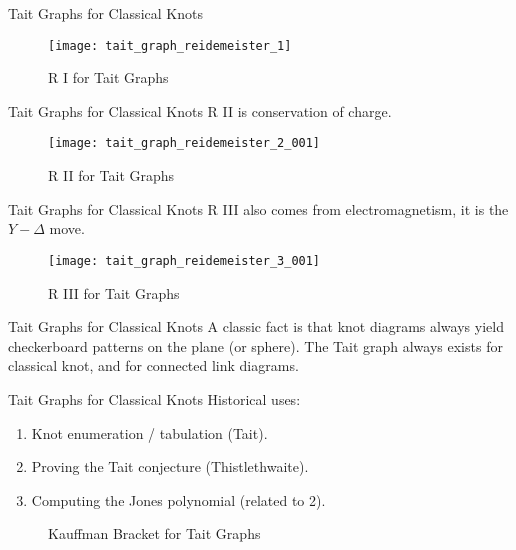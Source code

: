 \documentclass{beamer}
\begin{document}
    \begin{frame}{Tait Graphs for Classical Knots}
        \begin{figure}
            \centering
            \texttt{[image: tait\_graph\_reidemeister\_1]}
            \caption{R I for Tait Graphs}
        \end{figure}
    \end{frame}
    \begin{frame}{Tait Graphs for Classical Knots}
        R II is conservation of charge.
        \begin{figure}
            \centering
            \texttt{[image: tait\_graph\_reidemeister\_2\_001]}
            \caption{R II for Tait Graphs}
        \end{figure}
    \end{frame}
    \begin{frame}{Tait Graphs for Classical Knots}
        R III also comes from electromagnetism, it is the $Y-\Delta$ move.
        \begin{figure}
            \centering
            \texttt{[image: tait\_graph\_reidemeister\_3\_001]}
            \caption{R III for Tait Graphs}
        \end{figure}
    \end{frame}
    \begin{frame}{Tait Graphs for Classical Knots}
        A classic fact is that knot diagrams always yield checkerboard
        patterns on the plane (or sphere). The Tait graph always exists for
        classical knot, and for connected link diagrams.
    \end{frame}
    \begin{frame}{Tait Graphs for Classical Knots}
        Historical uses:
        \begin{enumerate}
            \item Knot enumeration / tabulation (Tait).
            \item Proving the Tait conjecture (Thistlethwaite).
            \item Computing the Jones polynomial (related to 2).
        \end{enumerate}
        \begin{figure}
                \centering
                \caption{Kauffman Bracket for Tait Graphs}
        \end{figure}
    \end{frame}
\end{document}
